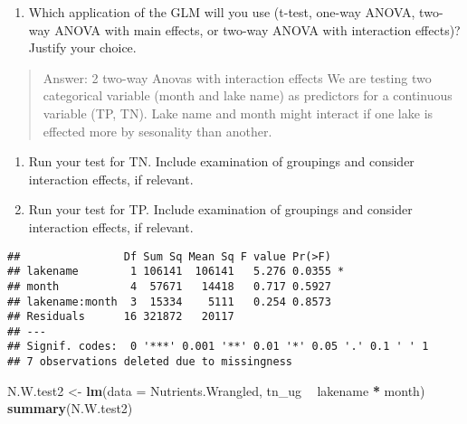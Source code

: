 \documentclass[]{article}
\newenvironment{Shaded}{\begin{snugshade}}{\end{snugshade}}
\newcommand{\CommentTok}[1]{\textcolor[rgb]{0.56,0.35,0.01}{\textit{#1}}}
\newcommand{\DataTypeTok}[1]{\textcolor[rgb]{0.13,0.29,0.53}{#1}}
\newcommand{\KeywordTok}[1]{\textcolor[rgb]{0.13,0.29,0.53}{\textbf{#1}}}
\newcommand{\NormalTok}[1]{#1}
\newcommand{\OperatorTok}[1]{\textcolor[rgb]{0.81,0.36,0.00}{\textbf{#1}}}
\newcommand{\StringTok}[1]{\textcolor[rgb]{0.31,0.60,0.02}{#1}}
\providecommand{\tightlist}{%
  \setlength{\itemsep}{0pt}\setlength{\parskip}{0pt}}
\begin{document}
\begin{enumerate}
\def\labelenumi{\arabic{enumi}.}
\setcounter{enumi}{3}
\tightlist
\item
  Which application of the GLM will you use (t-test, one-way ANOVA,
  two-way ANOVA with main effects, or two-way ANOVA with interaction
  effects)? Justify your choice.
\end{enumerate}

\begin{quote}
Answer: 2 two-way Anovas with interaction effects We are testing two
categorical variable (month and lake name) as predictors for a
continuous variable (TP, TN). Lake name and month might interact if one
lake is effected more by sesonality than another.
\end{quote}

\begin{enumerate}
\def\labelenumi{\arabic{enumi}.}
\setcounter{enumi}{4}
\item
  Run your test for TN. Include examination of groupings and consider
  interaction effects, if relevant.
\item
  Run your test for TP. Include examination of groupings and consider
  interaction effects, if relevant.
\end{enumerate}

\begin{Shaded}
\end{Shaded}

\begin{verbatim}
##                Df Sum Sq Mean Sq F value Pr(>F)  
## lakename        1 106141  106141   5.276 0.0355 *
## month           4  57671   14418   0.717 0.5927  
## lakename:month  3  15334    5111   0.254 0.8573  
## Residuals      16 321872   20117                 
## ---
## Signif. codes:  0 '***' 0.001 '**' 0.01 '*' 0.05 '.' 0.1 ' ' 1
## 7 observations deleted due to missingness
\end{verbatim}

\begin{Shaded}
\begin{Highlighting}[]
\NormalTok{N.W.test2 <-}\StringTok{ }\KeywordTok{lm}\NormalTok{(}\DataTypeTok{data =}\NormalTok{ Nutrients.Wrangled, tn_ug }\OperatorTok{~}\StringTok{ }\NormalTok{lakename }\OperatorTok{*}\StringTok{ }\NormalTok{month)}
\KeywordTok{summary}\NormalTok{(N.W.test2)}
\end{Highlighting}
\end{Shaded}
\end{document}
